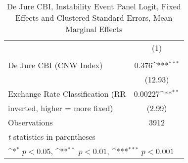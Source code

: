 \begin{table}[htbp]\centering
\def\sym#1{\ifmmode^{#1}\else\(^{#1}\)\fi}
\caption{De Jure CBI, Instability Event Panel Logit, Fixed Effects and Clustered Standard Errors, Mean Marginal Effects \label{margsJustBinInstabEventDJ}}
\begin{tabular}{l*{1}{c}}
\toprule
                                        &\multicolumn{1}{c}{(1)}\\
                                        &\multicolumn{1}{c}{}\\
\midrule
De Jure CBI (CNW Index)                 &    0.376\sym{***}\\
                                        &  (12.93)         \\
\addlinespace
Exchange Rate Classification (RR        &  0.00227\sym{**} \\
inverted, higher = more fixed)          &   (2.99)         \\
\midrule
Observations                            &     3912         \\
\bottomrule
\multicolumn{2}{l}{\footnotesize \textit{t} statistics in parentheses}\\
\multicolumn{2}{l}{\footnotesize \sym{*} \(p<0.05\), \sym{**} \(p<0.01\), \sym{***} \(p<0.001\)}\\
\end{tabular}
\end{table}
